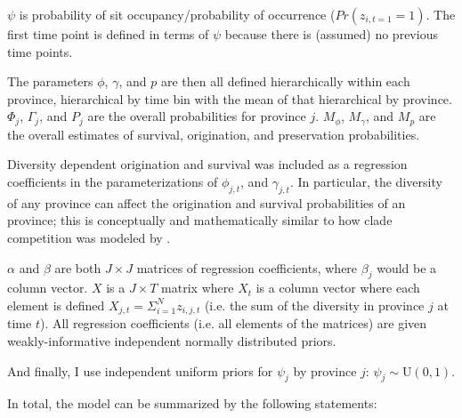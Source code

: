 \documentclass[12pt,letterpaper]{article}
\begin{document}
\(\psi\) is probability of sit occupancy/probability of occurrence (\(Pr(z_{i, t = 1} = 1)\). The first time point is defined in terms of \(\psi\) because there is (assumed) no previous time points.

The parameters \(\phi\), \(\gamma\), and \(p\) are then all defined hierarchically within each province, hierarchical by time bin with the mean of that hierarchical by province. \(\Phi_{j}\), \(\Gamma_{j}\), and \(P_{j}\) are the overall probabilities for province \(j\). \(M_{\phi}\), \(M_{\gamma}\), and \(M_{p}\) are the overall estimates of survival, origination, and preservation probabilities. 

Diversity dependent origination and survival was included as a regression coefficients in the parameterizations of \(\phi_{j, t}\), and \(\gamma_{j, t}\). In particular, the diversity of any province can affect the origination and survival probabilities of an province; this is conceptually and mathematically similar to how clade competition was modeled by \citet{Silvestro2015b}. 

\(\alpha\) and \(\beta\) are both \(J \times J\) matrices of regression coefficients, where \(\beta_{j}\) would be a column vector. \(X\) is a \(J \times T\) matrix where \(X_{t}\) is a column vector where each element is defined \(X_{j, t} = \Sigma_{i = 1}^{N} z_{i, j, t}\) (i.e. the sum of the diversity in province \(j\) at time \(t\)). All regression coefficients (i.e. all elements of the matrices) are given weakly-informative independent normally distributed priors.

And finally, I use independent uniform priors for \(\psi_{j}\) by province \(j\): \(\psi_{j} \sim \mathrm{U}(0, 1)\).

In total, the model can be summarized by the following statements:
\end{document}
